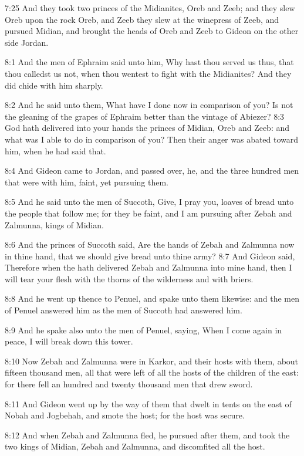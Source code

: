 7:25 And they took two princes of the Midianites, Oreb and Zeeb; and
they slew Oreb upon the rock Oreb, and Zeeb they slew at the winepress
of Zeeb, and pursued Midian, and brought the heads of Oreb and Zeeb to
Gideon on the other side Jordan.

8:1 And the men of Ephraim said unto him, Why hast thou served us
thus, that thou calledst us not, when thou wentest to fight with the
Midianites?  And they did chide with him sharply.

8:2 And he said unto them, What have I done now in comparison of you?
Is not the gleaning of the grapes of Ephraim better than the vintage
of Abiezer?  8:3 God hath delivered into your hands the princes of
Midian, Oreb and Zeeb: and what was I able to do in comparison of you?
Then their anger was abated toward him, when he had said that.

8:4 And Gideon came to Jordan, and passed over, he, and the three
hundred men that were with him, faint, yet pursuing them.

8:5 And he said unto the men of Succoth, Give, I pray you, loaves of
bread unto the people that follow me; for they be faint, and I am
pursuing after Zebah and Zalmunna, kings of Midian.

8:6 And the princes of Succoth said, Are the hands of Zebah and
Zalmunna now in thine hand, that we should give bread unto thine army?
8:7 And Gideon said, Therefore when the \LORD hath delivered Zebah and
Zalmunna into mine hand, then I will tear your flesh with the thorns
of the wilderness and with briers.

8:8 And he went up thence to Penuel, and spake unto them likewise: and
the men of Penuel answered him as the men of Succoth had answered him.

8:9 And he spake also unto the men of Penuel, saying, When I come
again in peace, I will break down this tower.

8:10 Now Zebah and Zalmunna were in Karkor, and their hosts with them,
about fifteen thousand men, all that were left of all the hosts of the
children of the east: for there fell an hundred and twenty thousand
men that drew sword.

8:11 And Gideon went up by the way of them that dwelt in tents on the
east of Nobah and Jogbehah, and smote the host; for the host was
secure.

8:12 And when Zebah and Zalmunna fled, he pursued after them, and took
the two kings of Midian, Zebah and Zalmunna, and discomfited all the
host.

